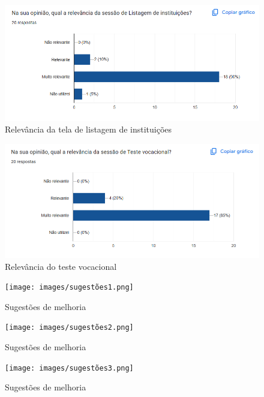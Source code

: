 \begin{apendicesenv}
\begin{figure}[H]
    \centering
    \includegraphics[width=1.0\linewidth]{images/relevanciaInstituicao.png}
    \caption{Relevância da tela de listagem de instituições}
    \label{fig:relevanciaInstituicoes}
\end{figure}

\begin{figure}[H]
    \centering
    \includegraphics[width=1.0\linewidth]{images/relevanciaTeste.png}
    \caption{Relevância do teste vocacional}
    \label{fig:relevanciaTeste}
\end{figure}


\begin{figure}[H]
    \centering
    \texttt{[image: images/sugestões1.png]}
    \caption{Sugestões de melhoria}
    \label{fig:sugestoes}
\end{figure}


\begin{figure}[H]
    \centering
    \texttt{[image: images/sugestões2.png]}
    \caption{Sugestões de melhoria}
    \label{fig:sugestoes}
\end{figure}


\begin{figure}[H]
    \centering
    \texttt{[image: images/sugestões3.png]}
    \caption{Sugestões de melhoria}
    \label{fig:sugestoes}
\end{figure}


\end{apendicesenv}
